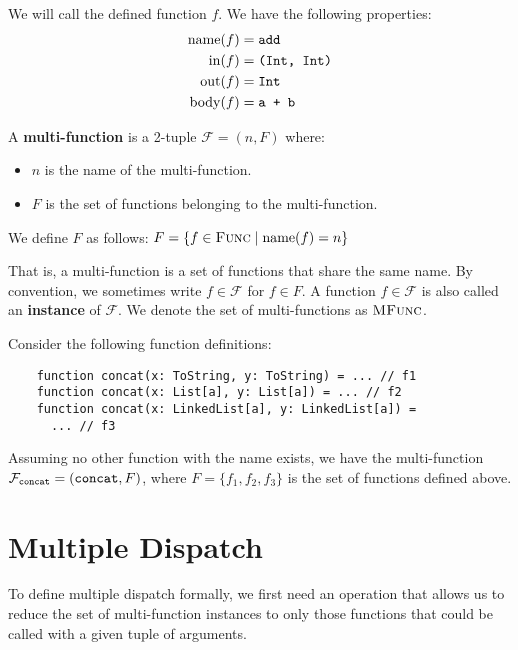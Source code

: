 \noindent We will call the defined function $f$. We have the following properties:
\begin{align*}
	\operatorname{name}(f) &= \text{\texttt{add}} \\
	\operatorname{in}(f) &= \texttt{(Int, Int)} \\
	\operatorname{out}(f) &= \texttt{Int} \\
	\operatorname{body}(f) &= \text{\texttt{a + b}}
\end{align*}

\begin{definition}
	A \textbf{multi-function} is a 2-tuple $\mathcal{F} = (n, F)$ where:
	\begin{itemize}
		\item $n$ is the name of the multi-function.
		\item $F$ is the set of functions belonging to the multi-function.
	\end{itemize}

	\noindent We define $F$ as follows: $F = \{ f \in \textsc{Func} \mid \operatorname{name}(f) = n \}$
\end{definition}

\noindent That is, a multi-function is a set of functions that share the same name. By convention, we sometimes write $f \in \mathcal{F}$ for $f \in F$. A function $f \in \mathcal{F}$ is also called an \textbf{instance} of $\mathcal{F}$. We denote the set of multi-functions as $\textsc{MFunc}$.

\bigskip

\noindent Consider the following function definitions:
\begin{lstlisting}
    function concat(x: ToString, y: ToString) = ... // f1
    function concat(x: List[a], y: List[a]) = ... // f2
    function concat(x: LinkedList[a], y: LinkedList[a]) = 
      ... // f3
\end{lstlisting}
	
\noindent Assuming no other function with the name  exists, we have the multi-function $\mathcal{F}_{\text{\texttt{concat}}} = (\text{\texttt{concat}}, F)$, where $F = \{ f_1, f_2, f_3 \}$ is the set of  functions defined above.



\section{Multiple Dispatch}

To define multiple dispatch formally, we first need an operation that allows us to reduce the set of multi-function instances to only those functions that could be called with a given tuple of arguments.

